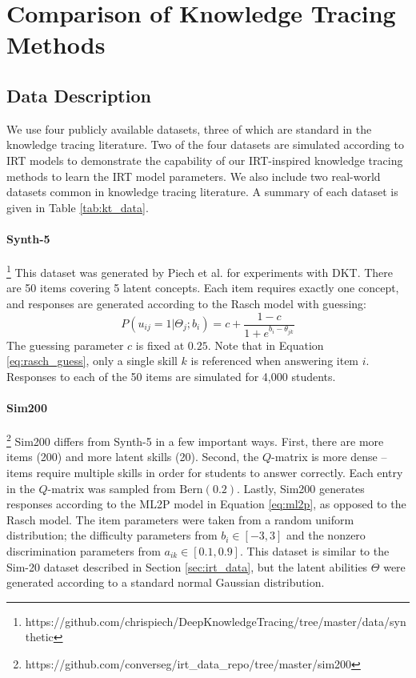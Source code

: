 \chapter{Comparison of Knowledge Tracing Methods}

\section{Data Description}\label{sec:kt_data}
We use four publicly available datasets, three of which are standard in the knowledge tracing literature. Two of the four datasets are simulated according to IRT models to demonstrate the capability of our IRT-inspired knowledge tracing methods to learn the IRT model parameters. We also include two real-world datasets common in knowledge tracing literature. A summary of each dataset is given in Table \ref{tab:kt_data}.

\subsubsection*{Synth-5}\footnote{https://github.com/chrispiech/DeepKnowledgeTracing/tree/master/data/synthetic}
This dataset was generated by Piech et al. \cite{piech2015} for experiments with DKT. There are 50 items covering 5 latent concepts. Each item requires exactly one concept, and responses are generated according to the Rasch model \cite{lord1968} with guessing: 
\begin{equation}
  P(u_{ij} = 1| \Theta_j; b_i) = c + \frac{1-c}{1 + e^{b_i - \theta_{jk}}}
  \label{eq:rasch_guess}
\end{equation}
The guessing parameter $c$ is fixed at $0.25$. Note that in Equation \ref{eq:rasch_guess}, only a single skill $k$ is referenced when answering item $i$. Responses to each of the 50 items are simulated for 4,000 students.

\subsubsection*{Sim200}\footnote{https://github.com/converseg/irt\_data\_repo/tree/master/sim200}
Sim200 differs from Synth-5 in a few important ways. First, there are more items (200) and more latent skills (20). Second, the $Q$-matrix is more dense -- items require multiple skills in order for students to answer correctly. Each entry in the $Q$-matrix was sampled from $\text{Bern}(0.2)$. Lastly, Sim200 generates responses according to the ML2P model in Equation \ref{eq:ml2p}, as opposed to the Rasch model. The item parameters were taken from a random uniform distribution; the difficulty parameters from $b_i \in [-3,3]$ and the nonzero discrimination parameters from $a_{ik} \in [0.1,0.9]$. This dataset is similar to the Sim-20 dataset described in Section \ref{sec:irt_data}, but the latent abilities $\Theta$ were generated according to a standard normal Gaussian distribution.

